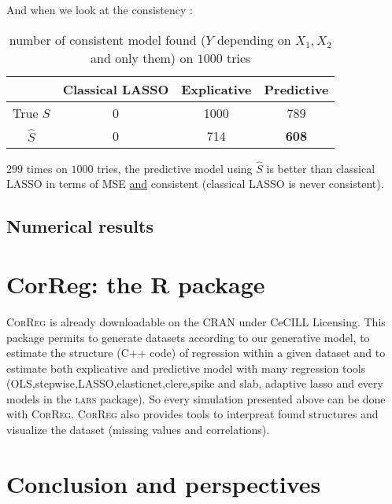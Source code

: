 \documentclass[12pt,a4paper]{report}
\begin{document}
		And when we look at the consistency :
		\begin{table}[h!]
		\centering	
		\begin{tabular}{|c|c|c|c|}
		\hline 
		 & Classical LASSO & Explicative & Predictive \\ 
		\hline 
		True $S$ &  0 & 1000 & 789 \\ 
		\hline 
		$\hat{S}$ & 0 & 714 & \textbf{608} \\ 
		\hline 
		\end{tabular} 
		\caption{number of consistent model found ($Y$ depending on $X_1,X_2$ and only them) on $1000$ tries}
		\end{table}				
				
		
		$299$ times on $1000$ tries, the predictive model using $\hat{S}$ is better than classical LASSO in terms of MSE \underline{and} consistent (classical LASSO is never consistent).
		

	\section{Numerical results}

\chapter{CorReg: the R package}	
	
		\textsc{CorReg} is already downloadable on the CRAN under CeCILL Licensing. This package permits to generate datasets according to our generative model, to estimate the structure (C++ code) of regression within a given dataset and to estimate both explicative and predictive model with many regression tools (OLS,stepwise,LASSO,elasticnet,clere,spike and slab, adaptive lasso and every models in the \textsc{lars} package). So every simulation presented above can be done with \textsc{CorReg}.
	\textsc{CorReg} also provides tools to interpreat found structures and visualize the dataset (missing values and correlations). %
	
\chapter{Conclusion and perspectives}
\end{document}
